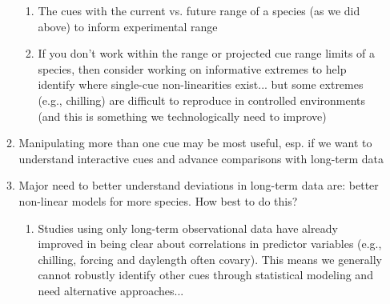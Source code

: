 \documentclass[11pt,letterpaper]{article}
\begin{document}
\begin{enumerate}
\begin{enumerate}
\begin{enumerate}
\item The cues with the current vs. future range of a species (as we did above) to inform experimental range %
\item If you don't work within the range or projected cue range limits of a species, then consider working on informative extremes to help identify where single-cue non-linearities exist... but some extremes (e.g., chilling) are difficult to reproduce in controlled environments (and this is something we technologically need to improve)
\end{enumerate}
\item Manipulating more than one cue may be most useful, esp. if we want to understand interactive cues and advance comparisons with long-term data 
\item Major need to better understand deviations in long-term data are: better non-linear models for more species. How best to do this?
\begin{enumerate}
\item Studies using only long-term observational data have already improved in being clear about correlations in predictor variables (e.g., chilling, forcing and daylength often covary). This means we generally cannot robustly identify other cues through statistical modeling and need alternative approaches... %

\end{enumerate}
\end{enumerate}
\end{enumerate}
\end{document}
